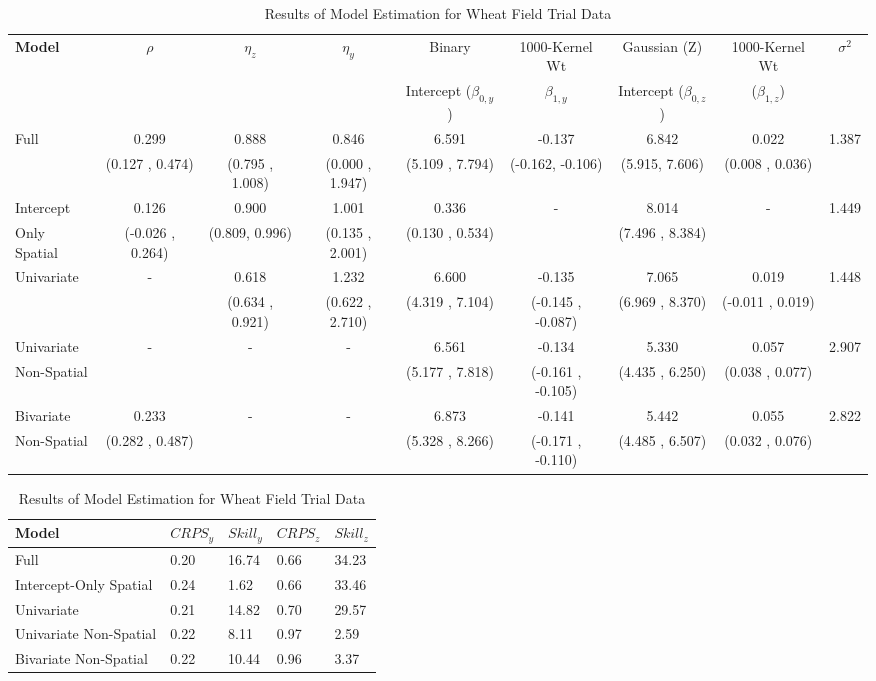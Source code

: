 \documentclass[12pt, a4paper, twoside]{article}
\begin{document}
\begin{table}[!h]
	\begin{tiny}
	\begin{tabular}{|l|c|c|c|c|c|c|c|c|}
		\hline
		\textbf{Model} & $\rho$ & $\eta_z$ & $\eta_y$ & Binary & 1000-Kernel Wt & Gaussian (Z)& 1000-Kernel Wt & $\sigma^2$ \\ 
		 &  &  &  & Intercept ($\beta_{0,y}$) & $\beta_{1,y}$ & Intercept ($\beta_{0,z}$) & ($\beta_{1,z}$) & \\
		\hline
	Full & 0.299 &0.888& 0.846& 6.591& -0.137& 6.842& 0.022& 1.387  \\ 
	& (0.127 , 0.474)& (0.795 , 1.008)& (0.000 , 1.947)& (5.109 , 7.794)& (-0.162, -0.106)&(5.915,  7.606)&(0.008 , 0.036)& \\\hline
	Intercept & 0.126 & 0.900 & 1.001& 0.336&-& 8.014&-&1.449 \\ 
	Only Spatial & (-0.026 , 0.264)& (0.809,  0.996)& (0.135 , 2.001)& (0.130 , 0.534)&  &(7.496 , 8.384)&& \\\hline
	Univariate &-& 0.618 & 1.232&  6.600&  -0.135&  7.065&  0.019& 1.448\\ 
	& & (0.634 , 0.921)& (0.622 , 2.710)& (4.319 , 7.104)&(-0.145 , -0.087)  &(6.969 , 8.370)&(-0.011 , 0.019)& \\\hline
	Univariate & - & - & - & 6.561& -0.134& 5.330&  0.057& 2.907  \\ 
	Non-Spatial&  &  &  & (5.177 , 7.818)&(-0.161 , -0.105)&(4.435 , 6.250)&(0.038 , 0.077)& \\\hline
	Bivariate & 0.233 & - & - & 6.873& -0.141& 5.442& 0.055& 2.822  \\ 
 	Non-Spatial	& (0.282 , 0.487)&  &  & (5.328 ,  8.266)&(-0.171 , -0.110)&(4.485 , 6.507)&(0.032 , 0.076)&\\
	\hline
	\end{tabular}
\end{tiny}

\vspace{.1cm}
\begin{tabular}{|l|l|l|l|l|}
	\hline
	 \textbf{Model} &$CRPS_y$ & $Skill_y$& $CRPS_z$ & $Skill_z$   \\
	 \hline
	 Full & 0.20 & 16.74 & 0.66 & 34.23\\
	 Intercept-Only Spatial & 0.24 & 1.62 & 0.66 & 33.46\\
	 Univariate & 0.21 & 14.82 & 0.70 & 29.57 \\
	 Univariate Non-Spatial& 0.22 & 8.11 & 0.97 & 2.59\\
	 Bivariate Non-Spatial & 0.22 & 10.44 & 0.96 & 3.37\\
	 \hline
\end{tabular}
\caption{Results of Model Estimation for Wheat Field Trial Data}
\label{wheatResults}
\end{table}
\end{document}
